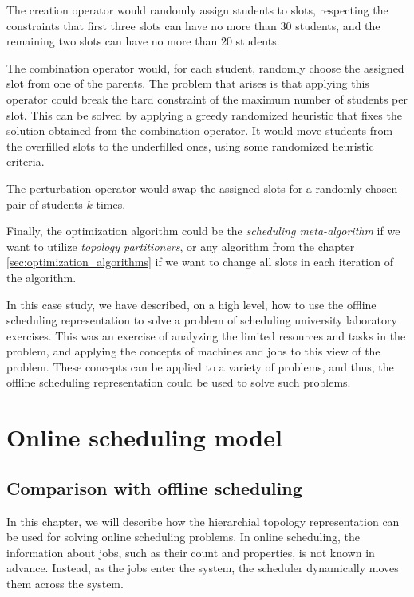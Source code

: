 The creation operator would randomly assign students to slots, respecting the constraints that first three slots can have no more than $30$ students, and the remaining two slots can have no more than $20$ students.

The combination operator would, for each student, randomly choose the assigned slot from one of the parents. The problem that arises is that applying this operator could break the hard constraint of the maximum number of students per slot. This can be solved by applying a greedy randomized heuristic that fixes the solution obtained from the combination operator. It would move students from the overfilled slots to the underfilled ones, using some randomized heuristic criteria.

The perturbation operator would swap the assigned slots for a randomly chosen pair of students $k$ times.

Finally, the optimization algorithm could be the \textit{scheduling meta-algorithm} if we want to utilize \textit{topology partitioners}, or any algorithm from the chapter \ref{sec:optimization_algorithms} if we want to change all slots in each iteration of the algorithm. 

In this case study, we have described, on a high level, how to use the offline scheduling representation to solve a problem of scheduling university laboratory exercises. This was an exercise of analyzing the limited resources and tasks in the problem, and applying the concepts of machines and jobs to this view of the problem. These concepts can be applied to a variety of problems, and thus, the offline scheduling representation could be used to solve such problems.

\chapter{Online scheduling model}
\label{sec:online_scheduling_model}

\section{Comparison with offline scheduling}

In this chapter, we will describe how the hierarchial topology representation can be used for solving online scheduling problems. In online scheduling, the information about jobs, such as their count and properties, is not known in advance. Instead, as the jobs enter the system, the scheduler dynamically moves them across the system.


